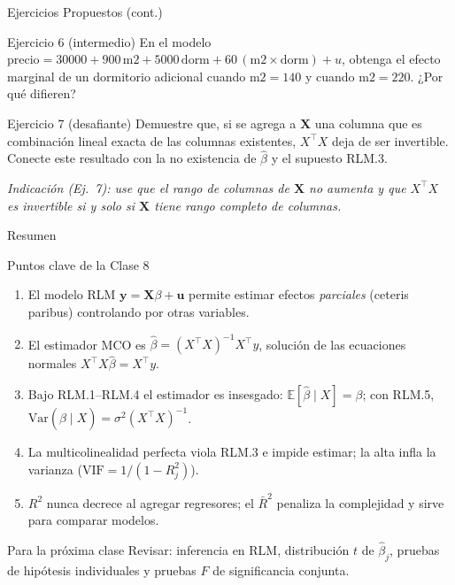 \documentclass{beamer}
\begin{document}
\begin{frame}{Ejercicios Propuestos (cont.)}

\begin{block}{Ejercicio 6 (intermedio)}
En el modelo $\text{precio}=30000+900\,\text{m2}+5000\,\text{dorm}+60\,(\text{m2}\times\text{dorm})+u$, obtenga el efecto marginal de un dormitorio adicional cuando $\text{m2}=140$ y cuando $\text{m2}=220$. ¿Por qué difieren?
\end{block}

\begin{block}{Ejercicio 7 (desafiante)}
Demuestre que, si se agrega a $\mathbf{X}$ una columna que es combinación lineal exacta de las columnas existentes, $X^{\top}X$ deja de ser invertible. Conecte este resultado con la no existencia de $\hat{\beta}$ y el supuesto RLM.3.
\end{block}

{\small \textit{Indicación (Ej.\ 7): use que el rango de columnas de $\mathbf{X}$ no aumenta y que $X^{\top}X$ es invertible si y solo si $\mathbf{X}$ tiene rango completo de columnas.}}

\end{frame}

\begin{frame}{Resumen}

\begin{block}{Puntos clave de la Clase 8}
\begin{enumerate}
    \item El modelo RLM $\mathbf{y}=\mathbf{X}\beta+\mathbf{u}$ permite estimar efectos \emph{parciales} (ceteris paribus) controlando por otras variables.
    \item El estimador MCO es $\hat{\beta}=(X^{\top}X)^{-1}X^{\top}y$, solución de las ecuaciones normales $X^{\top}X\hat{\beta}=X^{\top}y$.
    \item Bajo RLM.1--RLM.4 el estimador es insesgado: $\mathbb{E}[\hat{\beta}\mid X]=\beta$; con RLM.5, $\text{Var}(\hat{\beta}\mid X)=\sigma^2(X^{\top}X)^{-1}$.
    \item La multicolinealidad perfecta viola RLM.3 e impide estimar; la alta infla la varianza ($\text{VIF}=1/(1-R_j^2)$).
    \item $R^2$ nunca decrece al agregar regresores; el $\bar{R}^2$ penaliza la complejidad y sirve para comparar modelos.
\end{enumerate}
\end{block}

\begin{alertblock}{Para la próxima clase}
Revisar: inferencia en RLM, distribución $t$ de $\hat{\beta}_j$, pruebas de hipótesis individuales y pruebas $F$ de significancia conjunta.
\end{alertblock}

\end{frame}
\end{document}
